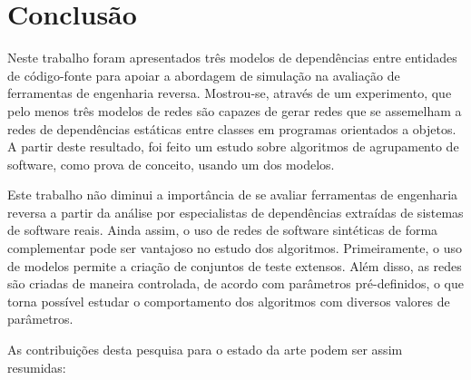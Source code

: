 

\chapter{Conclusão} \label{cap:conclusao}

Neste trabalho foram apresentados três modelos de dependências entre entidades de código-fonte para apoiar a abordagem de simulação na avaliação de ferramentas de engenharia reversa. Mostrou-se, através de um experimento, que pelo menos três modelos de redes são capazes de gerar redes que se assemelham a redes de dependências estáticas entre classes em programas orientados a objetos. A partir deste resultado, foi feito um estudo sobre algoritmos de agrupamento de software, como prova de conceito, usando um dos modelos.


Este trabalho não diminui a importância de se avaliar ferramentas de engenharia reversa a partir da análise por especialistas de dependências extraídas de sistemas de software reais. Ainda assim, o uso de redes de software sintéticas de forma complementar pode ser vantajoso no estudo dos algoritmos. Primeiramente, o uso de modelos permite a criação de conjuntos de teste extensos. Além disso, as redes são criadas de maneira controlada, de acordo com parâmetros pré-definidos, o que torna possível estudar o comportamento dos algoritmos com diversos valores de parâmetros.


As contribuições desta pesquisa para o estado da arte podem ser assim resumidas:

